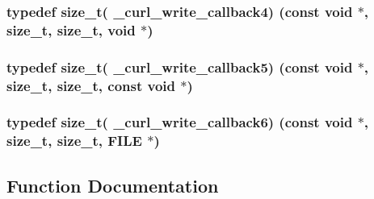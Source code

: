 \subsubsection[{\+\_\+curl\+\_\+write\+\_\+callback4}]{\setlength{\rightskip}{0pt plus 5cm}typedef size\+\_\+t( \+\_\+curl\+\_\+write\+\_\+callback4) (const void $\ast$, size\+\_\+t, size\+\_\+t, void $\ast$)}\label{typecheck-gcc_8h_a8c3b7fedfa10f92d318198423336183d}
\hypertarget{typecheck-gcc_8h_adbc7b265ad924bbb086fe32e0b52935f}{}
\subsubsection[{\+\_\+curl\+\_\+write\+\_\+callback5}]{\setlength{\rightskip}{0pt plus 5cm}typedef size\+\_\+t( \+\_\+curl\+\_\+write\+\_\+callback5) (const void $\ast$, size\+\_\+t, size\+\_\+t, const void $\ast$)}\label{typecheck-gcc_8h_adbc7b265ad924bbb086fe32e0b52935f}
\hypertarget{typecheck-gcc_8h_a7d38c5964bcf80455b4ac9fccb3bc4c3}{}
\subsubsection[{\+\_\+curl\+\_\+write\+\_\+callback6}]{\setlength{\rightskip}{0pt plus 5cm}typedef size\+\_\+t( \+\_\+curl\+\_\+write\+\_\+callback6) (const void $\ast$, size\+\_\+t, size\+\_\+t, F\+I\+L\+E $\ast$)}\label{typecheck-gcc_8h_a7d38c5964bcf80455b4ac9fccb3bc4c3}


\subsection{Function Documentation}
\hypertarget{typecheck-gcc_8h_a835f9ac5fa04c88a7cd643014f43c521}{}
